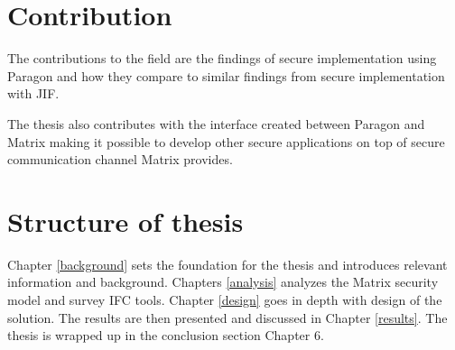  
 
 
\section{Contribution} %

The contributions to the field are the findings of secure implementation using Paragon and how they compare to similar findings from secure implementation with JIF.

The thesis also contributes with the interface created between Paragon and Matrix making it possible to develop other secure applications on top of secure communication channel Matrix provides. 

 
 
\section{Structure of thesis} %

Chapter \ref{background} sets the foundation for the thesis and introduces relevant information and background. Chapters \ref{analysis} analyzes the Matrix security model and survey IFC tools. Chapter \ref{design} goes in depth with design of the solution. The results are then presented and discussed in Chapter \ref{results}. The thesis is wrapped up in the conclusion section Chapter 6. 
 